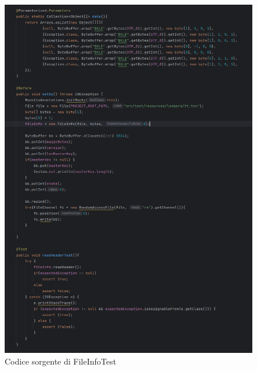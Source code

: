 \documentclass[12pt, a4paper]{article}
\begin{document}
  \begin{figure}
    \includegraphics[width=\linewidth]{./images/file_info/Code1ReadHeader.png}
    \caption{Codice sorgente di FileInfoTest}
    \label{fig:Code1ReadHeader}
  \end{figure}
\end{document}
